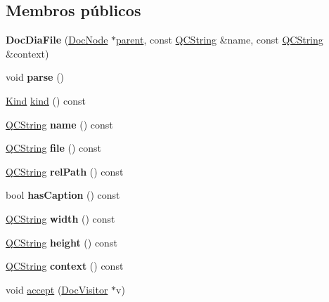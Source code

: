 \subsection*{Membros públicos}
\begin{DoxyCompactItemize}
\item 
\hypertarget{class_doc_dia_file_a783d2d6c1965d3a9cbe5ad7acc127eb3}{{\bfseries Doc\-Dia\-File} (\hyperlink{class_doc_node}{Doc\-Node} $\ast$\hyperlink{class_doc_node_abd7f070d6b0a38b4da71c2806578d19d}{parent}, const \hyperlink{class_q_c_string}{Q\-C\-String} \&name, const \hyperlink{class_q_c_string}{Q\-C\-String} \&context)}\label{class_doc_dia_file_a783d2d6c1965d3a9cbe5ad7acc127eb3}

\item 
\hypertarget{class_doc_dia_file_ad7c704b34912678d95c13243cacf9d7f}{void {\bfseries parse} ()}\label{class_doc_dia_file_ad7c704b34912678d95c13243cacf9d7f}

\item 
\hyperlink{class_doc_node_aa10c9e8951b8ccf714a59ec321bdac5b}{Kind} \hyperlink{class_doc_dia_file_aa9d037bed9f9a083d0cd01485637d843}{kind} () const 
\item 
\hypertarget{class_doc_dia_file_af92302878527ec555ba9e3fe066925ff}{\hyperlink{class_q_c_string}{Q\-C\-String} {\bfseries name} () const }\label{class_doc_dia_file_af92302878527ec555ba9e3fe066925ff}

\item 
\hypertarget{class_doc_dia_file_aeaa8cdb0fbabc1058b7d3813f2fd223b}{\hyperlink{class_q_c_string}{Q\-C\-String} {\bfseries file} () const }\label{class_doc_dia_file_aeaa8cdb0fbabc1058b7d3813f2fd223b}

\item 
\hypertarget{class_doc_dia_file_a3aa6799d4713d51d9cc4862af165671c}{\hyperlink{class_q_c_string}{Q\-C\-String} {\bfseries rel\-Path} () const }\label{class_doc_dia_file_a3aa6799d4713d51d9cc4862af165671c}

\item 
\hypertarget{class_doc_dia_file_a47d6a6a9de9fe305f0a40bc7ab568e28}{bool {\bfseries has\-Caption} () const }\label{class_doc_dia_file_a47d6a6a9de9fe305f0a40bc7ab568e28}

\item 
\hypertarget{class_doc_dia_file_a3b2930dfedd2909fb77430aee4aba6fa}{\hyperlink{class_q_c_string}{Q\-C\-String} {\bfseries width} () const }\label{class_doc_dia_file_a3b2930dfedd2909fb77430aee4aba6fa}

\item 
\hypertarget{class_doc_dia_file_ab6aa5410ea982fcf57c2dbb7e9701858}{\hyperlink{class_q_c_string}{Q\-C\-String} {\bfseries height} () const }\label{class_doc_dia_file_ab6aa5410ea982fcf57c2dbb7e9701858}

\item 
\hypertarget{class_doc_dia_file_a4d6bb4ed13678cf22ef5cb414076d9f5}{\hyperlink{class_q_c_string}{Q\-C\-String} {\bfseries context} () const }\label{class_doc_dia_file_a4d6bb4ed13678cf22ef5cb414076d9f5}

\item 
void \hyperlink{class_doc_dia_file_a7ba716e854ae2f8f87a4eb2140e302b6}{accept} (\hyperlink{class_doc_visitor}{Doc\-Visitor} $\ast$v)
\end{DoxyCompactItemize}
